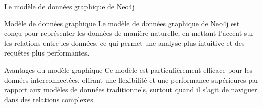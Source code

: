 \begin{frame}{Le modèle de données graphique de Neo4j}
  \begin{block}{Modèle de données graphique}
    Le modèle de données graphique de Neo4j est conçu pour représenter les données de manière naturelle, en mettant l'accent sur les relations entre les données, ce qui permet une analyse plus intuitive et des requêtes plus performantes.
  \end{block}
  \begin{block}{Avantages du modèle graphique}
    Ce modèle est particulièrement efficace pour les données interconnectées, offrant une flexibilité et une performance supérieures par rapport aux modèles de données traditionnels, surtout quand il s'agit de naviguer dans des relations complexes.
  \end{block}
\end{frame}